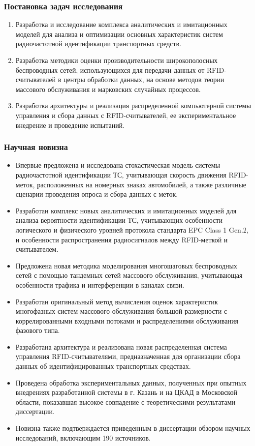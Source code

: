 \begin{frame}
    \frametitle{Постановка задач исследования}
    \begin{enumerate}
        \item Разработка и исследование комплекса аналитических и имитационных моделей для анализа и оптимизации основных характеристик систем радиочастотной идентификации транспортных средств.
        \item Разработка методики оценки производительности широкополосных беспроводных сетей, использующихся для передачи данных от RFID-считывателей в центры обработки данных, на основе методов теории массового обслуживания и марковских случайных процессов.
        \item Разработка архитектуры и реализация распределенной компьютерной системы управления и сбора данных с RFID-считывателей, ее экспериментальное внедрение и проведение испытаний.
    \end{enumerate}
\end{frame}


\begin{frame}[allowframebreaks]
    \frametitle{Научная новизна}
    \small
    \begin{itemize}
        \item Впервые предложена и исследована стохастическая модель системы радиочастотной идентификации ТС, учитывающая скорость движения RFID-меток, расположенных на номерных знаках автомобилей, а также различные сценарии проведения опроса и сбора данных с меток.
        \item Разработан комплекс новых аналитических и имитационных моделей для анализа вероятности идентификации ТС, учитывающих особенности логического и физического уровней протокола стандарта EPC Class 1 Gen.2, и особенности распространения радиосигналов между RFID-меткой и считывателем.
        \item Предложена новая методика моделирования многошаговых беспроводных сетей с помощью тандемных сетей массового обслуживания, учитывающая особенности трафика и интерференции в каналах связи.
        \item Разработан оригинальный метод вычисления оценок характеристик многофазных систем массового обслуживания большой размерности с коррелированными входными потоками и распределениями обслуживания фазового типа.
        \break
        \item Разработана архитектура и реализована новая распределенная система управления RFID-считывателями, предназначенная для организации сбора данных об идентифицированных транспортных средствах.
        \item Проведена обработка экспериментальных данных, полученных при опытных внедрениях разработанной системы в г. Казань и на ЦКАД в Московской области, показавшая высокое совпадение с теоретическими результатами диссертации.
        \item Новизна также подтверждается приведенным в диссертации обзором научных исследований, включающим 190 источников.
    \end{itemize}
\end{frame}

